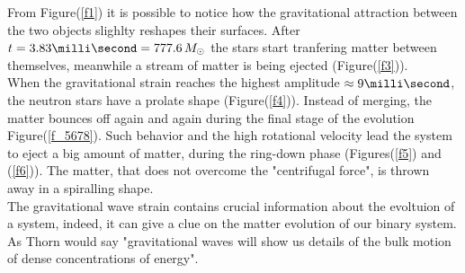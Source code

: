 From Figure(\ref{f1}) it is possible to notice how the gravitational attraction between the two objects slighlty reshapes their surfaces.
After $t = 3.83 \milli \second = 777.6 \, M _{\odot}$ the stars start tranfering matter between themselves, meanwhile a stream of matter is being ejected (Figure(\ref{f3})).\\
When the gravitational strain reaches the highest amplitude $\approx 9 \milli \second$, the neutron stars have a prolate shape (Figure(\ref{f4})).
Instead of merging, the matter bounces off again and again during the final stage of the evolution Figure(\ref{f_5678}).
Such behavior and the high rotational velocity lead the system to eject a big amount of matter, during the ring-down phase (Figures(\ref{f5}) and (\ref{f6})). 
The matter, that does not overcome the "centrifugal force", is thrown away in a spiralling shape.\\
The gravitational wave strain contains crucial information about the evoltuion of a system, indeed, it can give a clue on the matter evolution of our binary system.
As Thorn would say "gravitational waves will show us details of the bulk motion of dense concentrations of energy".\cite{thorne_gravitational_1995}

